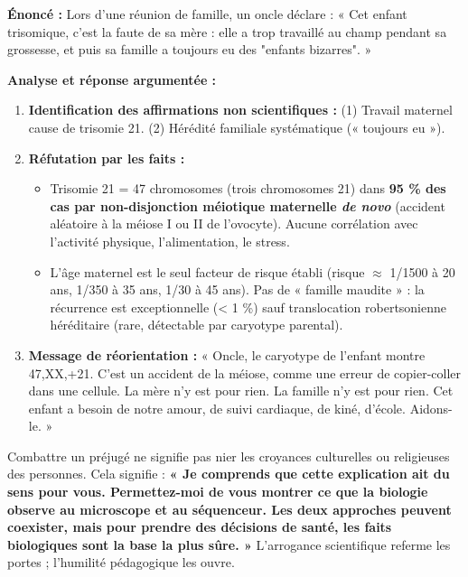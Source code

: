 \documentclass[11pt]{article}
\begin{document}
\begin{exoresolu}
\textbf{Énoncé :} Lors d'une réunion de famille, un oncle déclare : « Cet enfant trisomique, c'est la faute de sa mère : elle a trop travaillé au champ pendant sa grossesse, et puis sa famille a toujours eu des "enfants bizarres". »

\textbf{Analyse et réponse argumentée :}
\begin{enumerate}
    \item \textbf{Identification des affirmations non scientifiques :} (1) Travail maternel cause de trisomie 21. (2) Hérédité familiale systématique (« toujours eu »).
    \item \textbf{Réfutation par les faits :}
    \begin{itemize}
        \item Trisomie 21 = 47 chromosomes (trois chromosomes 21) dans \textbf{95 \% des cas par non-disjonction méiotique maternelle \textit{de novo}} (accident aléatoire à la méiose I ou II de l'ovocyte). Aucune corrélation avec l'activité physique, l'alimentation, le stress.
        \item L'âge maternel est le seul facteur de risque établi (risque $\approx$ 1/1500 à 20 ans, 1/350 à 35 ans, 1/30 à 45 ans). Pas de « famille maudite » : la récurrence est exceptionnelle (< 1 \%) sauf translocation robertsonienne héréditaire (rare, détectable par caryotype parental).
    \end{itemize}
    \item \textbf{Message de réorientation :} « Oncle, le caryotype de l'enfant montre 47,XX,+21. C'est un accident de la méiose, comme une erreur de copier-coller dans une cellule. La mère n'y est pour rien. La famille n'y est pour rien. Cet enfant a besoin de notre amour, de suivi cardiaque, de kiné, d'école. Aidons-le. »
\end{enumerate}
\end{exoresolu}

\begin{attention}
Combattre un préjugé ne signifie pas nier les croyances culturelles ou religieuses des personnes. Cela signifie : \textbf{« Je comprends que cette explication ait du sens pour vous. Permettez-moi de vous montrer ce que la biologie observe au microscope et au séquenceur. Les deux approches peuvent coexister, mais pour prendre des décisions de santé, les faits biologiques sont la base la plus sûre. »} L'arrogance scientifique referme les portes ; l'humilité pédagogique les ouvre.
\end{attention}
\end{document}
